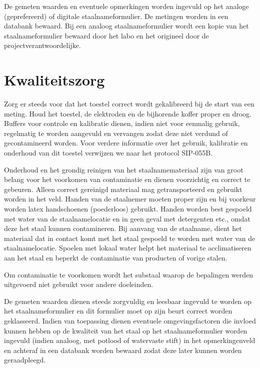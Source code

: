 \documentclass[
]{scrreprt}
\begin{document}
De gemeten waarden en eventuele opmerkingen worden ingevuld op het analoge (geprefereerd) of digitale staalnameformulier.
De metingen worden in een databank bewaard.
Bij een analoog staalnameformulier wordt een kopie van het staalnameformulier bewaard door het labo en het origineel door de projectverantwoordelijke.

\hypertarget{kwaliteitszorg}{%
\chapter{Kwaliteitszorg}\label{kwaliteitszorg}}

Zorg er steeds voor dat het toestel correct wordt gekalibreerd bij de start van een meting. Houd het toestel, de elektroden en de bijhorende koffer proper en droog. Buffers voor controle en kalibratie dienen, indien niet voor eenmalig gebruik, regelmatig te worden aangevuld en vervangen zodat deze niet verdund of gecontamineerd worden. Voor verdere informatie over het gebruik, kalibratie en onderhoud van dit toestel verwijzen we naar het protocol SIP-055B.

Onderhoud en het grondig reinigen van het staalnamemateriaal zijn van groot belang voor het voorkomen van contaminatie en dienen voorzichtig en correct te gebeuren. Alleen correct gereinigd materiaal mag getransporteerd en gebruikt worden in het veld. Handen van de staalnemer moeten proper zijn en bij voorkeur worden latex handschoenen (poederloos) gebruikt. Handen worden best gespoeld met water van de staalnamelocatie en in geen geval met detergenten etc., omdat deze het staal kunnen contamineren. Bij aanvang van de staalname, dient het materiaal dat in contact komt met het staal gespoeld te worden met water van de staalnamelocatie. Spoelen met lokaal water helpt het materiaal te acclimatiseren aan het staal en beperkt de contaminatie van producten of vorige stalen.

Om contaminatie te voorkomen wordt het substaal waarop de bepalingen werden uitgevoerd niet gebruikt voor andere doeleinden.

De gemeten waarden dienen steeds zorgvuldig en leesbaar ingevuld te worden op het staalnameformulier en dit formulier moet op zijn beurt correct worden geklasseerd. Indien van toepassing dienen eventuele omgevingsfactoren die invloed kunnen hebben op de kwaliteit van het staal op het staalnameformulier worden ingevuld (indien analoog, met potlood of watervaste stift) in het opmerkingenveld en achteraf in een databank worden bewaard zodat deze later kunnen worden geraadpleegd.
\end{document}
